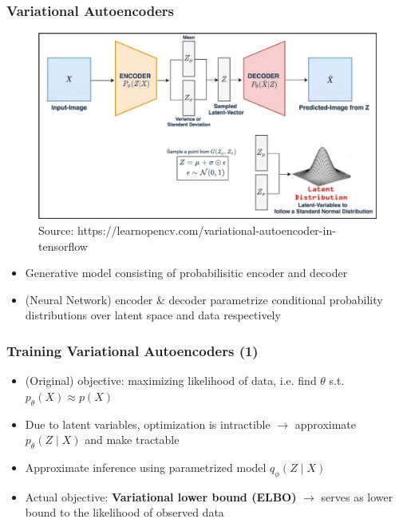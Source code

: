 \documentclass{beamer}
\theoremstyle{definition}
\begin{document}
    \begin{frame}
      \frametitle{Variational Autoencoders}
      \begin{figure}
        \includegraphics[scale=.125]{vae-diagram.jpg}
        \captionsetup{justification=centering}
        \caption*{\tiny{Source: https://learnopencv.com/variational-autoencoder-in-tensorflow}}
      \end{figure}
      \vspace{-5mm}
      \begin{itemize}
        \item Generative model consisting of probabilisitic encoder and decoder
        \item (Neural Network) encoder \& decoder parametrize conditional probability distributions over latent space and data respectively
      \end{itemize}

    \end{frame}
    \begin{frame}
      \frametitle{Training Variational Autoencoders (1)}

      \begin{itemize}
        \item (Original) objective: maximizing likelihood of data, i.e. find $\theta$ s.t. $p_{\theta}(X) \approx p(X)$
        \item Due to latent variables, optimization is intractible $\rightarrow$ approximate $p_{\theta}(Z \mid X)$ and make tractable
        \item Approximate inference using parametrized model $q_{\phi}(Z \mid X)$ %
        \item Actual objective: \textbf{Variational lower bound (ELBO)} $\rightarrow$ serves as lower bound to the likelihood of observed data
     \end{itemize}
    \end{frame}
\end{document}
